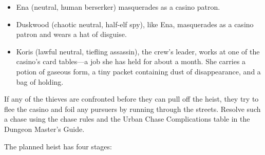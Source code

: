 \documentclass[10pt,a4paper,twoside,bg=print,twocolumn,openany,nodeprecatedcode]{dndbook}
\begin{document}
\begin{itemize}
\item Ena (neutral, human berserker) masquerades as a casino patron.
\item Duskwood (chaotic neutral, half-elf spy), like Ena, masquerades as a casino patron and wears a hat of disguise.
\item Koris (lawful neutral, tiefling assassin), the crew's leader, works at one of the casino's card tables—a job she has held for about a month. She carries a potion of gaseous form, a tiny packet containing dust of disappearance, and a bag of holding.
\end{itemize}

If any of the thieves are confronted before they can pull off the heist, they try to flee the casino and foil any pursuers by running through the streets. Resolve such a chase using the chase rules and the Urban Chase Complications table in the Dungeon Master's Guide.


The planned heist has four stages:
\end{document}
